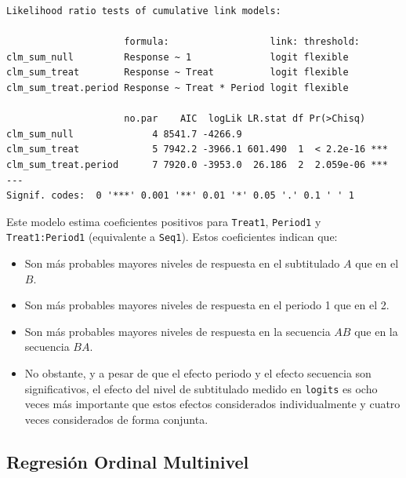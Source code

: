 \documentclass[
  12pt,
  a4paper,
  extrafontsizes,
  onecolumn,
  openright,
  table]{memoir}
\providecommand{\tightlist}{%
  \setlength{\itemsep}{0pt}\setlength{\parskip}{0pt}}\usepackage{longtable,booktabs,array}
\begin{document}
\scriptsize

\begin{verbatim}
Likelihood ratio tests of cumulative link models:
 
                     formula:                  link: threshold:
clm_sum_null         Response ~ 1              logit flexible  
clm_sum_treat        Response ~ Treat          logit flexible  
clm_sum_treat.period Response ~ Treat * Period logit flexible  

                     no.par    AIC  logLik LR.stat df Pr(>Chisq)    
clm_sum_null              4 8541.7 -4266.9                          
clm_sum_treat             5 7942.2 -3966.1 601.490  1  < 2.2e-16 ***
clm_sum_treat.period      7 7920.0 -3953.0  26.186  2  2.059e-06 ***
---
Signif. codes:  0 '***' 0.001 '**' 0.01 '*' 0.05 '.' 0.1 ' ' 1
\end{verbatim}

\normalsize

Este modelo estima coeficientes positivos para \texttt{Treat1},
\texttt{Period1} y \texttt{Treat1:Period1} (equivalente a
\texttt{Seq1}). Estos coeficientes indican que:

\begin{itemize}
\tightlist
\item
  Son más probables mayores niveles de respuesta en el subtitulado \(A\)
  que en el \(B\).
\item
  Son más probables mayores niveles de respuesta en el periodo 1 que en
  el 2.
\item
  Son más probables mayores niveles de respuesta en la secuencia \(AB\)
  que en la secuencia \(BA\).
\item
  No obstante, y a pesar de que el efecto periodo y el efecto secuencia
  son significativos, el efecto del nivel de subtitulado medido en
  \texttt{logits} es ocho veces más importante que estos efectos
  considerados individualmente y cuatro veces considerados de forma
  conjunta.
\end{itemize}

\hypertarget{sec-multinivel-2}{%
\subsection{Regresión Ordinal Multinivel}\label{sec-multinivel-2}}
\end{document}
